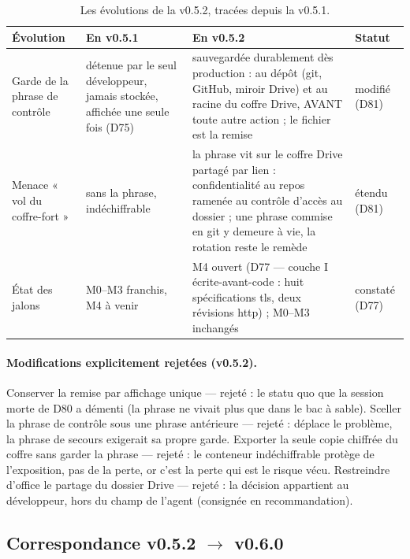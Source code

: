 \begin{table}[htbp]
\centering\small
\caption{Les évolutions de la v0.5.2, tracées depuis la v0.5.1.}
\label{tab:correspondance052}
\begin{tabularx}{\textwidth}{@{}l Y Y l@{}}
\toprule
\textbf{Évolution} & \textbf{En v0.5.1} & \textbf{En v0.5.2} & \textbf{Statut} \\
\midrule
Garde de la phrase de contrôle & détenue par le seul développeur, jamais stockée,
affichée une seule fois (D75) & sauvegardée durablement dès production :
 au dépôt (git, GitHub, miroir Drive) et au racine du
coffre Drive, AVANT toute autre action ; le fichier est la remise & modifié (D81) \\
Menace « vol du coffre-fort » & sans la phrase, indéchiffrable & la phrase vit sur le
coffre Drive partagé par lien : confidentialité au repos ramenée au contrôle d'accès au
dossier ; une phrase commise en git y demeure à vie, la rotation reste le remède &
étendu (D81) \\
État des jalons & M0–M3 franchis, M4 à venir & M4 ouvert (D77 — couche I
écrite-avant-code : huit spécifications tls, deux révisions http) ; M0–M3 inchangés &
constaté (D77) \\
\bottomrule
\end{tabularx}
\end{table}

\paragraph{Modifications explicitement rejetées (v0.5.2).} Conserver la remise par
affichage unique — rejeté : le statu quo que la session morte de D80 a démenti (la
phrase ne vivait plus que dans le bac à sable). Sceller la phrase de contrôle sous une
phrase antérieure — rejeté : déplace le problème, la phrase de secours exigerait sa
propre garde. Exporter la seule copie chiffrée du coffre sans garder la phrase — rejeté :
le conteneur indéchiffrable protège de l'exposition, pas de la perte, or c'est la perte
qui est le risque vécu. Restreindre d'office le partage du dossier Drive — rejeté : la
décision appartient au développeur, hors du champ de l'agent (consignée en
recommandation).

\subsection{Correspondance v0.5.2 $\to$ v0.6.0}\label{sec:evolutions060}

